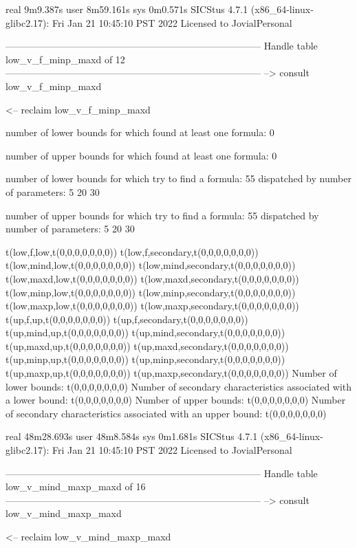 real	9m9.387s
user	8m59.161s
sys	0m0.571s
SICStus 4.7.1 (x86_64-linux-glibc2.17): Fri Jan 21 10:45:10 PST 2022
Licensed to JovialPersonal


--------------------------------------------------------------------------------
Handle table low_v_f_minp_maxd of 12
--------------------------------------------------------------------------------
--> consult low_v_f_minp_maxd

<-- reclaim low_v_f_minp_maxd

number of lower bounds for which found at least one formula: 0

number of upper bounds for which found at least one formula: 0

number of lower bounds for which try to find a formula: 55
dispatched by number of parameters: 5  20  30

number of upper bounds for which try to find a formula: 55
dispatched by number of parameters: 5  20  30

t(low,f,low,t(0,0,0,0,0,0,0))
t(low,f,secondary,t(0,0,0,0,0,0,0))
t(low,mind,low,t(0,0,0,0,0,0,0))
t(low,mind,secondary,t(0,0,0,0,0,0,0))
t(low,maxd,low,t(0,0,0,0,0,0,0))
t(low,maxd,secondary,t(0,0,0,0,0,0,0))
t(low,minp,low,t(0,0,0,0,0,0,0))
t(low,minp,secondary,t(0,0,0,0,0,0,0))
t(low,maxp,low,t(0,0,0,0,0,0,0))
t(low,maxp,secondary,t(0,0,0,0,0,0,0))
t(up,f,up,t(0,0,0,0,0,0,0))
t(up,f,secondary,t(0,0,0,0,0,0,0))
t(up,mind,up,t(0,0,0,0,0,0,0))
t(up,mind,secondary,t(0,0,0,0,0,0,0))
t(up,maxd,up,t(0,0,0,0,0,0,0))
t(up,maxd,secondary,t(0,0,0,0,0,0,0))
t(up,minp,up,t(0,0,0,0,0,0,0))
t(up,minp,secondary,t(0,0,0,0,0,0,0))
t(up,maxp,up,t(0,0,0,0,0,0,0))
t(up,maxp,secondary,t(0,0,0,0,0,0,0))
Number of lower bounds:                                             t(0,0,0,0,0,0,0)
Number of secondary characteristics associated with a lower bound:  t(0,0,0,0,0,0,0)
Number of upper bounds:                                             t(0,0,0,0,0,0,0)
Number of secondary characteristics associated with an upper bound: t(0,0,0,0,0,0,0)

real	48m28.693s
user	48m8.584s
sys	0m1.681s
SICStus 4.7.1 (x86_64-linux-glibc2.17): Fri Jan 21 10:45:10 PST 2022
Licensed to JovialPersonal


--------------------------------------------------------------------------------
Handle table low_v_mind_maxp_maxd of 16
--------------------------------------------------------------------------------
--> consult low_v_mind_maxp_maxd

<-- reclaim low_v_mind_maxp_maxd

